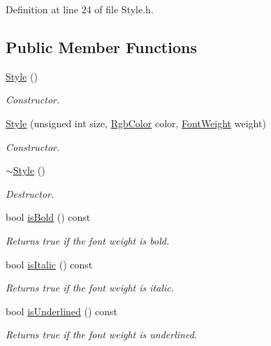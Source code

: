 Definition at line 24 of file Style.h.\subsection*{Public Member Functions}
\begin{CompactItemize}
\item 
\hyperlink{class_style_914f187818eb30c0cebe3df5378bfa0a}{Style} ()
\begin{CompactList}\small\item\em Constructor. \item\end{CompactList}\item 
\hyperlink{class_style_69801b8ce2b1520ef24e1a84d04609e5}{Style} (unsigned int size, \hyperlink{struct_rgb_color}{RgbColor} color, \hyperlink{_font_weight_8h_ecff23ba4a68486421bcea57e095fe66}{FontWeight} weight)
\begin{CompactList}\small\item\em Constructor. \item\end{CompactList}\item 
\hyperlink{class_style_7c798ef9b77bc94719542feade497725}{$\sim$Style} ()
\begin{CompactList}\small\item\em Destructor. \item\end{CompactList}\item 
bool \hyperlink{class_style_59d23709575c5e6e5434ef0af5ff94b6}{isBold} () const 
\begin{CompactList}\small\item\em Returns true if the font weight is bold. \item\end{CompactList}\item 
bool \hyperlink{class_style_5d57a686b93123e8ca5f8f91afb596c1}{isItalic} () const 
\begin{CompactList}\small\item\em Returns true if the font weight is italic. \item\end{CompactList}\item 
bool \hyperlink{class_style_d1fcc32d8b565aae007012eb603fedcd}{isUnderlined} () const 
\begin{CompactList}\small\item\em Returns true if the font weight is underlined. \item\end{CompactList}\item 

\end{CompactItemize}

